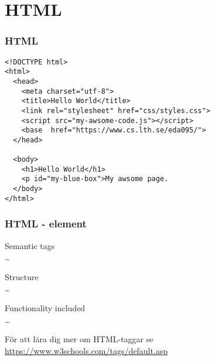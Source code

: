 \section{HTML}

\begin{frame}[fragile]
\frametitle{HTML}
\begin{lstlisting}[style=htmlcssjs]
<!DOCTYPE html>
<html>
  <head>
    <meta charset="utf-8">
    <title>Hello World</title>
    <link rel="stylesheet" href="css/styles.css">
    <script src="my-awsome-code.js"></script>
    <base  href="https://www.cs.lth.se/eda095/">
  </head>

  <body>
    <h1>Hello World</h1>
    <p id="my-blue-box">My awsome page.
  </body>
</html>
\end{lstlisting}
\end{frame}

\begin{frame}[fragile]
\frametitle{HTML - element}

Semantic tags\\
\ldots
\bigskip

Structure\\
\ldots
\bigskip

Functionality included\\
\ldots
\bigskip
\color{structure}

För att lära dig mer om HTML-taggar se \url{https://www.w3schools.com/tags/default.asp}
\end{frame}

